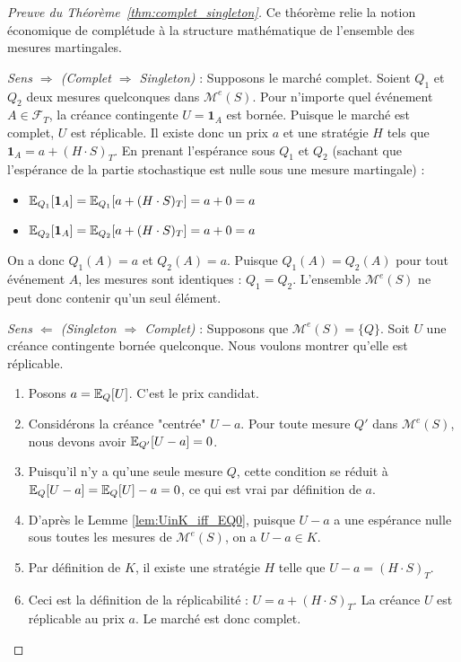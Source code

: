 \begin{proof}[Preuve du Théorème~\ref{thm:complet_singleton}]
Ce théorème relie la notion économique de complétude à la structure mathématique de l'ensemble des mesures martingales.

\emph{Sens $\Rightarrow$ (Complet $\Rightarrow$ Singleton)} :
Supposons le marché complet. Soient $Q_1$ et $Q_2$ deux mesures quelconques dans $\mathcal{M}^e(S)$.
Pour n'importe quel événement $A \in \mathcal{F}_T$, la créance contingente $U = \mathbf{1}_A$ est bornée.
Puisque le marché est complet, $U$ est réplicable. Il existe donc un prix $a$ et une stratégie $H$ tels que $\mathbf{1}_A = a + (H \cdot S)_T$.
En prenant l'espérance sous $Q_1$ et $Q_2$ (sachant que l'espérance de la partie stochastique est nulle sous une mesure martingale) :
\begin{itemize}
    \item $\mathbb{E}_{Q_1}[\mathbf{1}_A] = \mathbb{E}_{Q_1}[a + (H \cdot S)_T] = a + 0 = a$
    \item $\mathbb{E}_{Q_2}[\mathbf{1}_A] = \mathbb{E}_{Q_2}[a + (H \cdot S)_T] = a + 0 = a$
\end{itemize}
On a donc $Q_1(A) = a$ et $Q_2(A) = a$.
Puisque $Q_1(A) = Q_2(A)$ pour tout événement $A$, les mesures sont identiques : $Q_1 = Q_2$. L'ensemble $\mathcal{M}^e(S)$ ne peut donc contenir qu'un seul élément.

\smallskip
\emph{Sens $\Leftarrow$ (Singleton $\Rightarrow$ Complet)} :
Supposons que $\mathcal{M}^e(S) = \{Q\}$. Soit $U$ une créance contingente bornée quelconque. Nous voulons montrer qu'elle est réplicable.
\begin{enumerate}
    \item Posons $a = \mathbb{E}_Q[U]$. C'est le prix candidat.
    \item Considérons la créance "centrée" $U - a$. Pour toute mesure $Q'$ dans $\mathcal{M}^e(S)$, nous devons avoir $\mathbb{E}_{Q'}[U-a] = 0$.
    \item Puisqu'il n'y a qu'une seule mesure $Q$, cette condition se réduit à $\mathbb{E}_Q[U-a] = \mathbb{E}_Q[U] - a = 0$, ce qui est vrai par définition de $a$.
    \item D'après le Lemme \ref{lem:UinK_iff_EQ0}, puisque $U-a$ a une espérance nulle sous toutes les mesures de $\mathcal{M}^e(S)$, on a $U-a \in K$.
    \item Par définition de $K$, il existe une stratégie $H$ telle que $U-a = (H \cdot S)_T$.
    \item Ceci est la définition de la réplicabilité : $U = a + (H \cdot S)_T$. La créance $U$ est réplicable au prix $a$. Le marché est donc complet.
\end{enumerate}
\end{proof}


